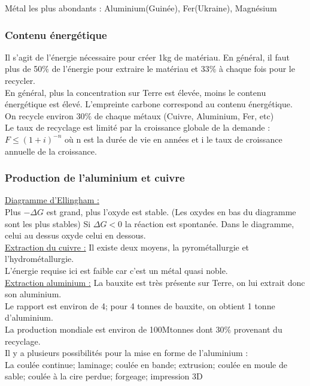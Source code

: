 \documentclass[../main.tex]{subfiles}
\begin{document}
Métal les plus abondants : Aluminium(Guinée), Fer(Ukraine), Magnésium\\

\subsubsection{Contenu énergétique}
Il s'agit de l'énergie nécessaire pour créer 1kg de matériau. En général, il faut plus de 50$\%$ de l'énergie pour extraire le matériau et 33$\%$ à chaque fois pour le recycler.  \\
En général, plus la concentration sur Terre est élevée, moins le contenu énergétique est élevé. L'empreinte carbone correspond au contenu énergétique.\\

On recycle environ 30$\%$ de chaque métaux (Cuivre, Aluminium, Fer, etc)\\
Le taux de recyclage est limité par la croissance globale de la demande : $F \leq (1+i)^{-n}$ où n est la durée de vie en années et i le taux de croissance annuelle de la croissance.

\subsubsection{Production de l'aluminium et cuivre}
\quad \underline{Diagramme d'Ellingham :}\\
Plus $-\Delta G$ est grand, plus l'oxyde est stable. (Les oxydes en bas du diagramme sont les plus stables) Si $\Delta G < 0$ la réaction est spontanée. Dans le diagramme, celui au dessus oxyde celui en dessous.\\

\quad \underline{Extraction du cuivre :} Il existe deux moyens, la pyrométallurgie et l'hydrométallurgie.\\ 
L'énergie requise ici est faible car c'est un métal quasi noble.\\

\quad \underline{Extraction aluminium :} La bauxite est très présente sur Terre, on lui extrait donc son aluminium.\\
Le rapport est environ de 4; pour 4 tonnes de bauxite, on obtient 1 tonne d'aluminium.\\

La production mondiale est environ de 100Mtonnes dont 30$\%$ provenant du recyclage.\\
Il y a plusieurs possibilités pour la mise en forme de l'aluminium : \\
La coulée continue; laminage; coulée en bande; extrusion; coulée en moule de sable; coulée à la cire perdue; forgeage; impression 3D \\
\end{document}
